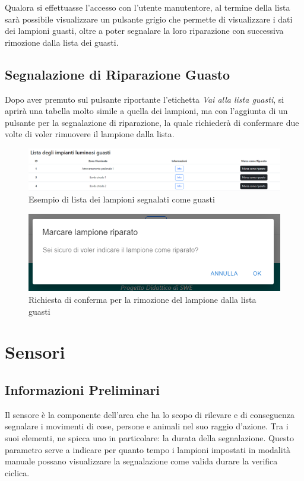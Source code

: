 \documentclass[a4paper, 12pt]{article}
\begin{document}
Qualora si effettuasse l'accesso con l'utente manutentore, al termine della lista sarà possibile visualizzare un pulsante grigio che permette di visualizzare i dati dei lampioni guasti, oltre a poter segnalare la loro riparazione con successiva rimozione dalla lista dei guasti.

\subsection{Segnalazione di Riparazione Guasto}
Dopo aver premuto sul pulsante riportante l'etichetta \textit{Vai alla lista guasti}, si aprirà una tabella molto simile a quella dei lampioni, ma con l'aggiunta di un pulsante per la segnalazione di riparazione, la quale richiederà di confermare due volte di voler rimuovere il lampione dalla lista.
\begin{figure}[H]
\centering
\includegraphics[width=\textwidth]{ListaGuastiVistaManutentore}
\caption{Esempio di lista dei lampioni segnalati come guasti}
\end{figure}
\begin{figure}[H]
\centering
\includegraphics[width=\textwidth]{ModaleRiparazioneLampione}
\caption{Richiesta di conferma per la rimozione del lampione dalla lista guasti}
\end{figure}

\newpage
\section{Sensori}
\subsection{Informazioni Preliminari}
Il sensore è la componente dell'area che ha lo scopo di rilevare e di conseguenza segnalare i movimenti di cose, persone e animali nel suo raggio d'azione. Tra i suoi elementi, ne spicca uno in particolare: la durata della segnalazione. Questo parametro serve a indicare per quanto tempo i lampioni impostati in modalità manuale possano visualizzare la segnalazione come valida durare la verifica ciclica.
\end{document}
